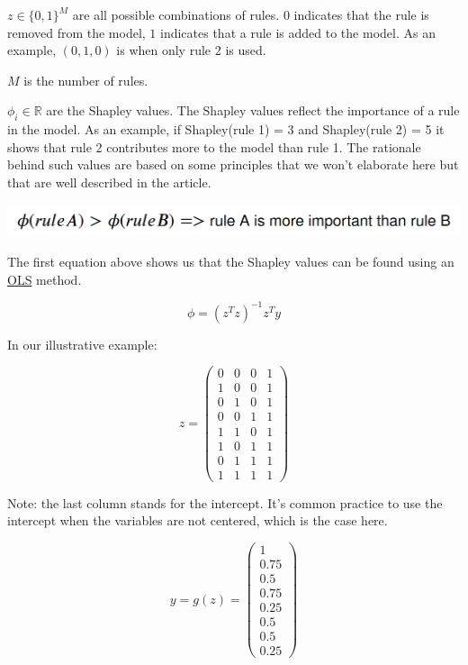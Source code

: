 $z \in \{0,1\}^M$ are all possible combinations of rules. $0$ indicates that the rule is removed from the model, $1$ indicates that a rule is added to the model. As an example, $(0,1,0)$ is when only rule 2 is used.

$M$ is the number of rules. 

$\phi_i \in \mathbb{R}$ are the Shapley values. The Shapley values reflect the importance of a rule in the model. As an example, if Shapley(rule 1) = 3 and Shapley(rule 2) = 5 it shows that rule 2 contributes more to the model than rule 1. The rationale behind such values are based on some principles that we won't elaborate here but that are well described in the article. \\

\begin{center}
\includegraphics[scale=0.2]{./../img/rule-shapley.png}
\end{center}

The first equation above shows us that the Shapley values can be found using an \href{https://en.wikipedia.org/wiki/Ordinary_least_squares}{OLS} method.

$$\phi = (z^Tz)^{-1}z^Ty$$

In our illustrative example:

$$z = \begin{pmatrix}
0 & 0 & 0 & 1\\
1 & 0 & 0 & 1\\
0 & 1 & 0 & 1\\
0 & 0 & 1 & 1\\
1 & 1 & 0 & 1\\
1 & 0 & 1 & 1\\
0 & 1 & 1 & 1\\
1 & 1 & 1 & 1
\end{pmatrix}$$

Note: the last column stands for the intercept. It's common practice to use the intercept when the variables are not centered, which is the case here.

$$y = g(z) = \begin{pmatrix}
1 \\
0.75 \\
0.5 \\
0.75 \\
0.25 \\
0.5 \\
0.5 \\
0.25
\end{pmatrix}$$

